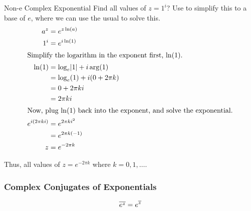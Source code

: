 \begin{example}[Lecture 3]{Non-e Complex Exponential}
  Find all values of $z=1^{i}$?
  \tcblower{}
  Use  to simplify this to a base of $e$, where we can use the usual  to solve this.
  \begin{align*}
    a^{z} &= e^{z \ln(a)} \\
    1^{i} &= e^{i \ln(1)} \\
    \intertext{Simplify the logarithm in the exponent first, $\ln(1)$.}
    \ln(1) &= \log_{e} \lvert 1 \rvert + i \arg(1) \\
          &= \log_{e}(1) + i (0 + 2\pi k) \\
          &= 0 + 2\pi k i \\
          &= 2\pi k i \\
    \intertext{Now, plug $\ln(1)$ back into the exponent, and solve the exponential.}
    e^{i (2\pi k i)} &= e^{2\pi k i^{2}} \\
          &= e^{2\pi k (-1)} \\
    z &= e^{-2\pi k}
  \end{align*}

  Thus, all values of $z = e^{-2\pi k}$ where $k = 0, 1, \ldots$.
\end{example}

\subsubsection{Complex Conjugates of Exponentials}\label{app:Exponential_Complex_Conjugates}
\begin{equation}\label{eq:Exponential_Complex_Conjugate}
  \overline{e^{z}} = e^{\overline{z}}
\end{equation}


